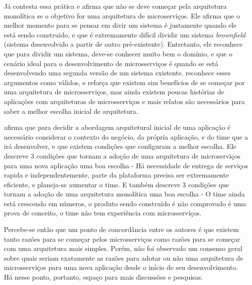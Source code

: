Já  contesta essa prática e afirma que não se deve começar pela arquitetura monolítica se o objetivo for uma arquitetura de microserviços. Ele afirma que o melhor momento para se pensar em divir um sistema é justamente quando ele está sendo construido, e que é extremamente difícil dividir um sistema \emph{brownfield} (sistema desenvolvido a partir de outro pré-existente). Entretanto, ele reconhece que para dividir um sistema, deve-se conhecer muito bem o domínio, e que o cenário ideal para o desenvolvimento de microsserviços é quando se está desenvolvendo uma segunda versão de um sistema existente.  reconhece esses argumentos como válidos, e reforça que existem sim benefícios de se começar por uma arquitetura de microsserviços, mas ainda existem poucas histórias de aplicações com arquiteturas de microsserviços e mais relatos são necessários para saber a melhor escolha inicial de arquitetura. \cite{dontStartWithMonolith-tilkov,martin-fowler-monolith-first}


 afirma que para decidir a abordagem arquitetural inicial de uma aplicação é necessário considerar o contexto do negócio, da própria aplicação, e do time que a irá desenvolver, e que existem condições que configuram a melhor escolha. Ele descreve 3 condições que tornam a adoção de uma arquitetura de microserviços para uma nova aplicação uma boa escolha - Há necessidade de entrega de serviços rapida e independentemente, parte da plataforma precisa ser extremamente eficiente, e planeja-se aumentar o time. E também descreve 3 condições que tornam a adoção de uma arquitetura monolítica uma boa escolha - O time ainda está crescendo em números, o produto sendo construído é não comprovado é uma prova de conceito, o time não tem experiência com microsserviços.

Percebe-se então que um ponto de concordância entre os autores é que existem tanto razões para se começar pelos microsserviços como razões para se começar com uma arquitetura mais simples. Porém, não foi observado um consenso geral sobre quais seriam exatamente as razões para adotar ou não uma arquitetura de microsserviços para uma nova aplicação desde o início de seu desenvolvimento. Há nesse ponto, portanto, espaço para mais discussões e pesquisas.

